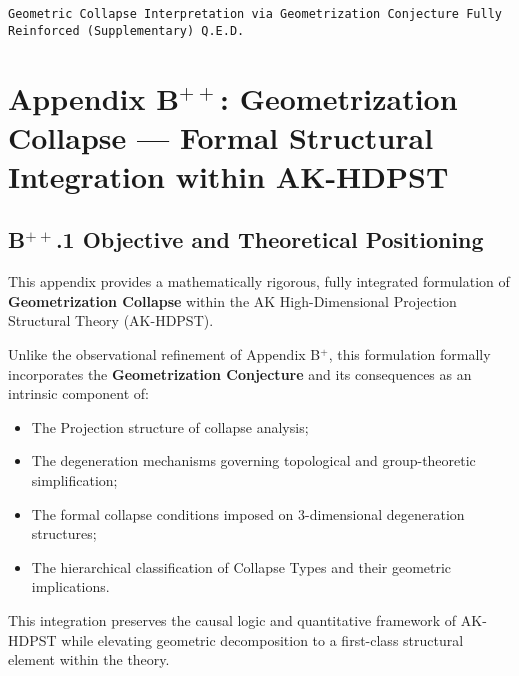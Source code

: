 \documentclass[11pt]{article}
\begin{document}
\begin{flushright}
\texttt{Geometric Collapse Interpretation via Geometrization Conjecture \quad Fully Reinforced (Supplementary) \quad Q.E.D.}
\end{flushright}




\section*{Appendix B$^{++}$: Geometrization Collapse — Formal Structural Integration within AK-HDPST}

\subsection*{B$^{++}$.1 Objective and Theoretical Positioning}

This appendix provides a mathematically rigorous, fully integrated formulation of \textbf{Geometrization Collapse} within the AK High-Dimensional Projection Structural Theory (AK-HDPST).

Unlike the observational refinement of Appendix B$^{+}$, this formulation formally incorporates the \textbf{Geometrization Conjecture} and its consequences as an intrinsic component of:

\begin{itemize}
    \item The Projection structure of collapse analysis;
    \item The degeneration mechanisms governing topological and group-theoretic simplification;
    \item The formal collapse conditions imposed on $3$-dimensional degeneration structures;
    \item The hierarchical classification of Collapse Types and their geometric implications.
\end{itemize}

This integration preserves the causal logic and quantitative framework of AK-HDPST while elevating geometric decomposition to a first-class structural element within the theory.
\end{document}
